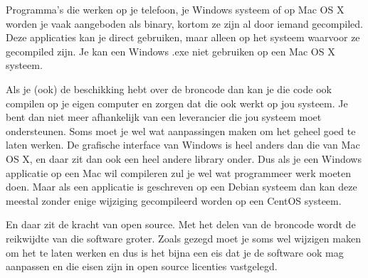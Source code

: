 Programma's die werken op je telefoon, je Windows systeem of op Mac OS X worden je vaak aangeboden als binary, kortom ze zijn al door iemand gecompiled. Deze applicaties kan je direct gebruiken, maar alleen op het systeem waarvoor ze gecompiled zijn. Je kan een Windows .exe niet gebruiken op een Mac OS X systeem.

Als je (ook) de beschikking hebt over de broncode dan kan je die code ook compilen op je eigen computer en zorgen dat
die ook werkt op jou systeem. Je bent dan niet meer afhankelijk van een leverancier die jou systeem moet ondersteunen.
Soms moet je wel wat aanpassingen maken om het geheel goed te laten werken. De grafische interface van Windows is heel
anders dan die van Mac OS X, en daar zit dan ook een heel andere library onder. Dus als je een Windows applicatie op
een Mac wil compileren zul je wel wat programmeer werk moeten doen. Maar als een applicatie is geschreven op een
Debian systeem dan kan deze meestal zonder enige wijziging gecompileerd worden op een CentOS systeem.

En daar zit de kracht van open source. Met het delen van de broncode wordt de reikwijdte van die software groter. Zoals gezegd moet je soms wel wijzigen maken om het te laten werken en dus is het bijna een eis dat je de software ook mag aanpassen en die eisen zijn in open source licenties vastgelegd.

